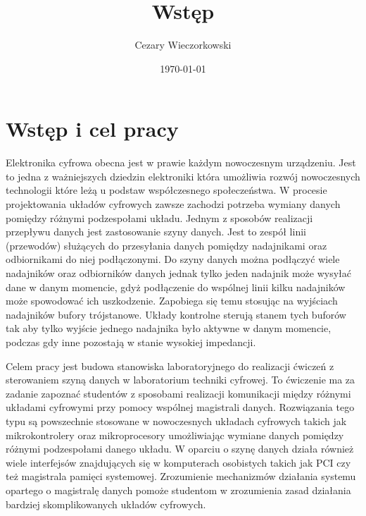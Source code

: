 \documentclass[../main.tex]{subfiles}
\author{Cezary Wieczorkowski}
\date{\today}
\title{Wstęp}
\begin{document}
\section{Wstęp i cel pracy}

Elektronika cyfrowa obecna jest w prawie każdym nowoczesnym urządzeniu. Jest to jedna z ważniejszych dziedzin elektroniki 
która umożliwia rozwój nowoczesnych technologii które leżą u podstaw współczesnego społeczeństwa. W procesie projektowania układów cyfrowych
zawsze zachodzi potrzeba wymiany danych pomiędzy różnymi podzespołami układu. Jednym z sposobów realizacji przepływu danych jest zastosowanie
szyny danych. Jest to zespół linii (przewodów) służących do przesyłania danych pomiędzy nadajnikami oraz odbiornikami do niej podłączonymi. 
Do szyny danych można podłączyć wiele nadajników oraz odbiorników danych jednak tylko jeden nadajnik może wysyłać dane w danym momencie, 
gdyż podłączenie do wspólnej linii kilku nadajników może spowodować ich uszkodzenie. Zapobiega się temu stosując na wyjściach 
nadajników bufory trójstanowe. Układy kontrolne sterują stanem tych buforów tak aby tylko wyjście jednego nadajnika było aktywne w danym
momencie, podczas gdy inne pozostają w stanie wysokiej impedancji. 
\par
Celem pracy jest budowa stanowiska laboratoryjnego do realizacji ćwiczeń z sterowaniem szyną danych w laboratorium techniki cyfrowej.
To ćwiczenie ma za zadanie zapoznać studentów z sposobami realizacji komunikacji między różnymi układami cyfrowymi przy pomocy
wspólnej magistrali danych. Rozwiązania tego typu są powszechnie stosowane w nowoczesnych układach cyfrowych takich jak mikrokontrolery oraz
mikroprocesory umożliwiając wymiane danych pomiędzy różnymi podzespołami danego układu. W oparciu o szynę danych działa również wiele interfejsów 
znajdujących się w komputerach osobistych takich jak PCI czy też magistrala pamięci systemowej. Zrozumienie mechanizmów działania systemu opartego o 
magistralę danych pomoże studentom w zrozumienia zasad działania bardziej skomplikowanych układów cyfrowych.
\end{document}
